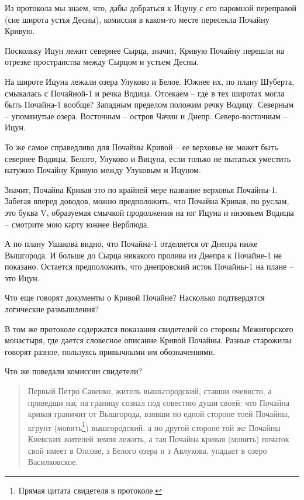 Из протокола мы знаем, что, дабы добраться к Ицуну с его паромной переправой (сие широта устья Десны), комиссия в каком-то месте пересекла Почайну Кривую.

Поскольку Ицун лежит севернее Сырца, значит, Кривую Почайну перешли на отрезке пространства между Сырцом и устьем Десны.

На широте Ицуна лежали озера Улуково и Белое. Южнее их, по плану Шуберта, смыкалась с Почайной-1 и речка Водица. Отсекаем – где в тех широтах могла быть Почайна-1 вообще? Западным пределом положим речку Водицу. Северным – упомянутые озера. Восточным – остров Чачин и Днепр. Северо-восточным – Ицун. 

То же самое справедливо для Почайны Кривой – ее верховье не может быть севернее Водицы, Белого, Улуково и Вицуна, если только не пытаться уместить натужно Почайну Кривую между Улуковым и Ицуном.

Значит, Почайна Кривая это по крайней мере название верховья Почайны-1. Забегая вперед доводов, можно предположить, что Почайна Кривая, по руслам, это буква V, образуемая смычкой продолжения на юг Ицуна и низовьем Водицы – смотрите мою карту южнее Верблюда.

А по плану Ушакова видно, что Почайна-1 отделяется от Днепра ниже Вышгорода. И больше до Сырца никакого пролива из Днепра к Почайне-1 не показано. Остается предположить, что днепровский исток Почайны-1 на плане – это Ицун.

Что еще говорят документы о Кривой Почайне? Насколько подтвердятся логические размышления?

В том же протоколе содержатся показания свидетелей со стороны Межигорского монастыря, где дается словесное описание Кривой Почайны. Разные старожилы говорят разное, пользуясь привычными им обозначениями.%

Что же поведали комиссии свидетели?

\begin{quotation}
Первый Петро Савенко, житель вышьгородский, ставши очевисто, а приведши нас на границу сознал под совестию души своей: что Почайна кривая граничит от Вышгорода, взявши по едной стороне тоей Почайны, кгрунт (мовить\footnote{Прямая цитата свидетеля в протоколе.}) вышгородский, а по другой стороне той же Почайны Киевских жителей земля лежить, а тая Почайна кривая (мовить) початок свой имеет в Олсове, з Белого озера и з Авлукова, упадает в озеро Василковское.
\end{quotation}

